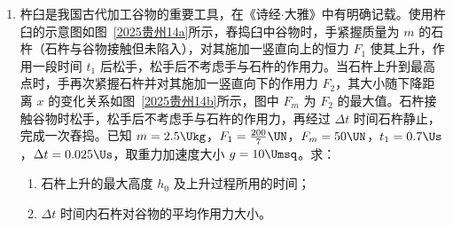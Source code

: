 \documentclass[\gkver]{gaokaozhenti}
\begin{document}
\begin{enumerate}
\begin{enumerate}
\item
波在木材中的传播方向及速度；
\item
在 $0 \sim 3\times10^{-6} \Us$ 时间内，质点 $P$ 运动的路程。
\end{enumerate}


\item
杵臼是我国古代加工谷物的重要工具，在《诗经$\cdot$大雅》中有明确记载。使用杵臼的示意图如图~\ref{2025贵州14a}所示，舂捣臼中谷物时，手紧握质量为 $m$ 的石杵（石杵与谷物接触但未陷入），对其施加一竖直向上的恒力 $F_{1}$ 使其上升，作用一段时间 $t_{1}$ 后松手，松手后不考虑手与石杵的作用力。当石杵上升到最高点时，手再次紧握石杵并对其施加一竖直向下的作用力 $F_{2}$，其大小随下降距离 $x$ 的变化关系如图~\ref{2025贵州14b}所示，图中 $F_{m}$ 为 $F_{2}$ 的最大值。石杵接触谷物时松手，松手后不考虑手与石杵的作用力，再经过 $\Delta t$ 时间石杵静止，完成一次舂捣。已知 $m = 2.5 \Ukg$，$F_{1} = \frac{200}{7} \UN$，$F_{m} = 50 \UN$，$t_{1} = 0.7 \Us$，$\Delta t = 0.025 \Us$，取重力加速度大小 $g = 10 \Umsq$。求：

\begin{enumerate}
\item
石杵上升的最大高度 $h_{0}$ 及上升过程所用的时间；
\item
$\Delta t$ 时间内石杵对谷物的平均作用力大小。
\end{enumerate}


\end{enumerate}
\end{document}

